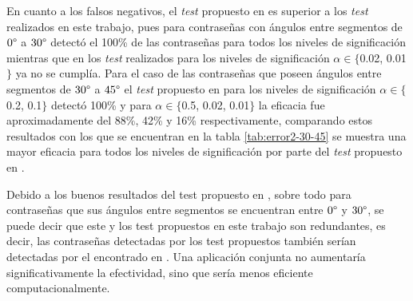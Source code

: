 \documentclass[12pt]{report}
\begin{document}
En cuanto a los falsos negativos, el \textit{test} propuesto en \cite{13} es superior a los \textit{test} realizados en este trabajo, pues para contraseñas con ángulos entre segmentos de  $0\degree$ a $30\degree$ detectó el 100\% de las contraseñas para todos los niveles de significación mientras que en los \textit{test} realizados para los niveles de significación  $\alpha \in \{$0.02, 0.01$\}$ ya no se cumplía. Para el caso de las contraseñas que poseen ángulos entre segmentos de $30\degree$ a $45\degree$ el \textit{test} propuesto en \cite{13} para los niveles de significación $\alpha \in \{$0.2, 0.1$\}$ detectó 100\% y para $\alpha \in \{$0.5, 0.02, 0.01$\}$ la eficacia fue aproximadamente  del 88\%, 42\% y 16\% respectivamente, comparando estos resultados con los que se encuentran en la tabla \ref{tab:error2-30-45} se muestra una mayor eficacia para todos los niveles de significación por parte del \textit{test} propuesto en \cite{13}.

Debido a los buenos resultados del test propuesto en \cite{13}, sobre todo para contraseñas que sus ángulos entre segmentos se encuentran entre $0\degree$ y $30\degree$, se puede decir que este y los test propuestos en este trabajo son redundantes, es decir, las contraseñas detectadas por los test propuestos también serían detectadas por el encontrado en \cite{13}. Una aplicación conjunta no aumentaría significativamente la efectividad, sino que sería menos eficiente computacionalmente.

\end{document}
